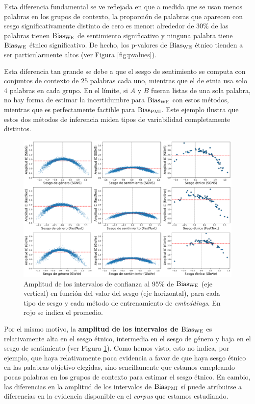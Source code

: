 Esta diferencia fundamental se ve reflejada en que a medida que se usan menos palabras en los grupos de contexto, la proporción de palabras que aparecen con sesgo significativamente distinto de cero es menor: alrededor de 30\% de las palabras tienen $\BiasWE$ de sentimiento significativo y ninguna palabra tiene $\BiasWE$ étnico significativo. De hecho, los p-valores de $\BiasWE$ étnico tienden a ser particularmente altos (ver Figura \ref{fig:pvalues}).  

Esta diferencia tan grande se debe a que el sesgo de sentimiento se computa con conjuntos de contexto de 25 palabras cada uno, mientras que el de etnia usa solo 4 palabras en cada grupo. En el límite, si $A$ y $B$ fueran listas de una sola palabra, no hay forma de estimar la incertidumbre para $\BiasWE$ con estos métodos, mientras que es perfectamente factible para $\operatorname{Bias_{PMI}}$. Este ejemplo ilustra que estos dos métodos de inferencia miden tipos de variabilidad completamente distintos.

\begin{figure}[h]
    \centering
    \includegraphics[width=\textwidth]{img/grid_ics.png}
    \caption[Amplitud de los intervalos de confianza al 95\% de $\BiasWE$ en función del valor del sesgo, para cada tipo de sesgo y cada método de entrenamiento de \emph{embeddings}]{
        Amplitud de los intervalos de confianza al 95\% de $\BiasWE$ (eje vertical) en función del valor del sesgo (eje horizontal), para cada tipo de sesgo y cada método de entrenamiento de \emph{embeddings}. En rojo se indica el promedio.
        }
    \label{fig:grid_ics_bias_we}
\end{figure}

Por el mismo motivo, la \textbf{amplitud de los intervalos de $\BiasWE$} es relativamente alta en el sesgo étnico, intermedia en el sesgo de género y baja en el sesgo de sentimiento (ver Figura \ref{fig:grid_ics_bias_we}). Como hemos visto, esto no indica, por ejemplo, que haya relativamente poca evidencia a favor de que haya sesgo étnico en las palabras objetivo elegidas, sino sencillamente que estamos emepleando pocas palabras en los grupos de contexto para estimar el sesgo étnico. En cambio, las diferencias en la amplitud de los intervalos de $\operatorname{Bias_{PMI}}$ sí puede atribuirse a diferencias en la evidencia disponible en el \emph{corpus} que estamos estudiando.

